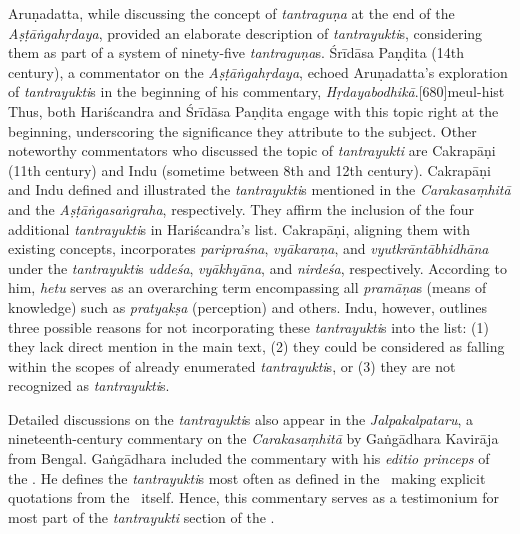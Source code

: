 Aruṇadatta, while discussing the concept of \emph{tantraguṇa} at the end of the 
\emph{Aṣṭāṅgahṛdaya}, 
provided an elaborate description of \emph{tantrayukti}s, 
considering them as part of a system of ninety-five \emph{tantraguṇa}s. 
Śrīdāsa Paṇḍita (14th century), a commentator on the \emph{Aṣṭāṅgahṛdaya}, 
echoed Aruṇadatta's exploration of \emph{tantrayukti}s 
in the beginning of his commentary, 
\emph{Hṛdayabodhikā}.[680]{meul-hist} 
Thus, both Hariścandra and Śrīdāsa Paṇḍita engage with this topic right at the 
beginning, 
underscoring the significance they attribute to the subject. 
Other noteworthy commentators who discussed the topic of \emph{tantrayukti} 
are Cakrapāṇi (11th century) 
and Indu (sometime between 8th and 12th century). 
Cakrapāṇi and Indu defined and illustrated the \emph{tantrayukti}s 
mentioned in the \emph{Carakasaṃhitā} and the \emph{Aṣṭāṅgasaṅgraha}, 
respectively. 
They affirm the inclusion of the four additional \emph{tantrayukti}s in 
Hariścandra's list. 
Cakrapāṇi, aligning them with existing concepts, 
incorporates \emph{paripraśna}, \emph{vyākaraṇa}, 
and \emph{vyutkrāntābhidhāna} under the \emph{tantrayukti}s 
\emph{uddeśa}, 
\emph{vyākhyāna}, and \emph{nirdeśa}, respectively. 
According to him, \emph{hetu} serves as an overarching term 
encompassing all \emph{pramāṇa}s (means of knowledge) 
such as \emph{pratyakṣa} (perception) and others. 
Indu, however, outlines three possible reasons 
for not incorporating these \emph{tantrayukti}s into the list: 
(1) they lack direct mention in the main text, 
(2) they could be considered as falling within the scopes of already enumerated 
\emph{tantrayukti}s, or 
(3) they are not recognized as \emph{tantrayukti}s. 

Detailed discussions on the \emph{tantrayukti}s also appear 
in the \emph{Jalpakalpataru}, a nineteenth-century commentary 
on the \emph{Carakasaṃhitā} by Gaṅgādhara Kavirāja from Bengal.
Gaṅgādhara included the commentary with his \emph{editio princeps} of the 
\CS. 
He defines the \emph{tantrayukti}s most often as defined in the \SS\ 
making explicit quotations from the \SS\ itself.
Hence, this commentary serves as a testimonium for most part 
of the \emph{tantrayukti} section of the \SS. 

